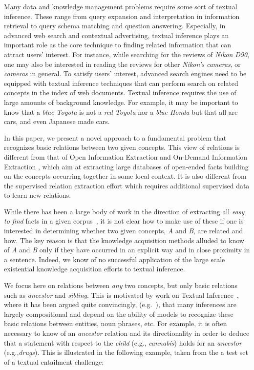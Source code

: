 Many data and knowledge management problems require some sort of
textual inference. These range from query expansion and interpretation
in information retrieval to query schema matching and question
answering. Especially, in advanced web search and contextual
advertising, textual inference plays an important role as the core
technique to finding related information that can attract users'
interest. For instance, while searching for the reviews of {\em Nikon
  D90}, one may also be interested in reading the reviews for other
{\em Nikon's cameras}, or {\em cameras} in general. To satisfy users'
interest, advanced search engines need to be equipped with textual
inference techniques that can perform search on related concepts in
the index of web documents. Textual inference requires the use of
large amounts of background knowledge. For example, it may be
important to know that a {\em blue Toyota} is not a {\em red Toyota}
nor a {\em blue Honda} but that all are cars, and even Japanese made
cars.

In this paper, we present a novel approach to a fundamental problem
that recognizes basic relations between two given concepts. This view
of relations is different from that of Open Information Extraction
\cite{BCSBE07} and On-Demand Information Extraction \cite{Sekine06},
which aim at extracting large databases of open-ended facts building
on the concepts occurring together in some local context. It is also
different from the supervised relation extraction\cite{RothYi04}
effort which requires additional supervised data to learn new
relations.

While there has been a large body of work in the direction of extracting all {\em easy to find} facts in a given
corpus~\cite{banko-etzioni:2008:ACLMain,davidov-rappoport:2008:ACLMain2,pacsca-vandurme:2008:ACLMain},
it is not clear how to make use of these if one is interested in determining whether two given concepts,
{\em A} and {\em B}, are related and how.
The key reason is that the knowledge acquisition methods alluded to know of {\em A} and {\em B} only if they have occurred
in an explicit way and in close proximity in a sentence. Indeed, we
know of no successful application of the large scale existential
knowledge acquisition efforts to textual inference.
  
We focus here on relations between {\em any} two concepts, but only basic relations such as {\em ancestor} and {\em sibling}. This is motivated by work on Textual Inference~\cite{DaganGlMa06,HaghighiNMa05,BGPRS05}, where it has been
argued quite convincingly, (e.g.~\cite{maccartney-manning:2008:PAPERS}), that many
inferences are largely compositional and depend on the ability of 
models to recognize these basic relations between entities, noun phrases, etc. For example, it is often necessary to
know of an {\em ancestor} relation and its directionality in order to
deduce that a statement with respect to the {\em child} (e.g., {\em
  cannabis}) holds for an {\em ancestor} (e.g.,{\em drugs}). This is
illustrated in the following example, taken from the a test set of a
textual entailment challenge:

